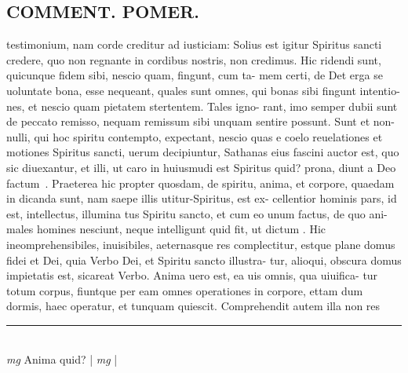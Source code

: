 \documentclass{article}
\begin{document}
\begin{pages}
\section*{COMMENT. POMER.  }\pstart testimonium, nam corde creditur ad iusticiam: Solius est igitur Spiritus sancti credere, quo non regnante in cordibus nostris, non credimus. Hic ridendi sunt, quicunque fidem sibi, nescio quam, fingunt, cum ta- mem certi, de Det erga se uoluntate bona, esse nequeant, quales sunt omnes, qui bonas sibi fingunt intentio- nes, et nescio quam pietatem stertentem. Tales igno- rant, imo semper dubii sunt de peccato remisso, nequam remissum sibi unquam sentire possunt. Sunt et non- nulli, qui hoc spiritu contempto, expectant, nescio quas e coelo reuelationes et motiones Spiritus sancti, uerum decipiuntur, Sathanas eius fascini auctor est, quo sic diuexantur, et illi, ut caro in huiusmudi est Spiritus quid? prona, diunt a Deo factum . Praeterea hic propter quosdam, de spiritu, anima, et corpore, quaedam in dicanda sunt, nam saepe illis utitur-Spiritus, est ex- cellentior hominis pars, id est, intellectus, illumina tus Spiritu sancto, et cum eo unum factus, de quo ani- males homines nesciunt, neque intelligunt quid fit, ut dictum . Hic ineomprehensibiles, inuisibiles, aeternasque res complectitur, estque plane domus fidei et Dei, quia Verbo Dei, et Spiritu sancto illustra- tur, alioqui, obscura domus impietatis est, sicareat Verbo. Anima uero est, ea uis omnis, qua uiuifica- tur totum corpus, fiuntque per eam omnes operationes in corpore, ettam dum dormis, haec operatur, et tunquam quiescit. Comprehendit autem illa non res  \pend
\vspace{0.5cm}\noindent
\vspace{0.2cm}\rule{1cm}{0.2pt}\\ 
\hspace{0.2cm}\textit{mg}
\footnotesize Anima quid? 
\normalsize| 
\hspace{0.2cm}\textit{mg}
\footnotesize 
\normalsize| 

\end{pages}
\end{document}
